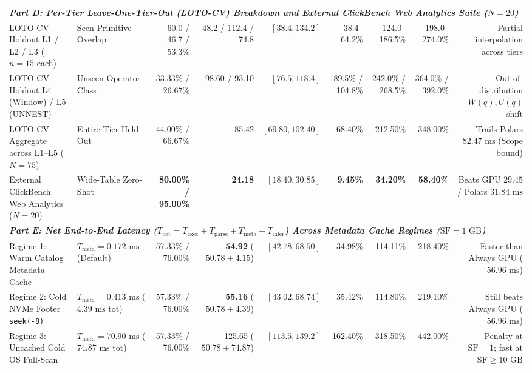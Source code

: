 \documentclass[10pt,a4paper]{article}
\begin{document}
\begin{table}[t!]
{\begin{tabular}{llrrrrrrr}
\hline
\multicolumn{9}{l}{\textit{\textbf{Part D: Per-Tier Leave-One-Tier-Out (LOTO-CV) Breakdown and External ClickBench Web Analytics Suite ($N=20$)}}} \\
LOTO-CV Holdout L1 / L2 / L3 ($n=15$ each) & Seen Primitive Overlap & 60.0 / 46.7 / 53.3\% & 48.2 / 112.4 / 74.8 & $[38.4, 134.2]$ & 38.4--64.2\% & 124.0--186.5\% & 198.0--274.0\% & Partial interpolation across tiers \\
LOTO-CV Holdout L4 (Window) / L5 (UNNEST) & Unseen Operator Class & 33.33\% / 26.67\% & 98.60 / 93.10 & $[76.5, 118.4]$ & 89.5\% / 104.8\% & 242.0\% / 268.5\% & 364.0\% / 392.0\% & Out-of-distribution $W(q), U(q)$ shift \\
LOTO-CV Aggregate across L1--L5 ($N=75$) & Entire Tier Held Out & 44.00\% / 66.67\% & 85.42 & $[69.80, 102.40]$ & 68.40\% & 212.50\% & 348.00\% & Trails Polars $82.47\text{ ms}$ (Scope bound) \\
External ClickBench Web Analytics ($N=20$) & Wide-Table Zero-Shot & \textbf{80.00\% / 95.00\%} & \textbf{24.18} & $[18.40, 30.85]$ & \textbf{9.45\%} & \textbf{34.20\%} & \textbf{58.40\%} & Beats GPU $29.45$ / Polars $31.84\text{ ms}$ \\
\hline
\multicolumn{9}{l}{\textit{\textbf{Part E: Net End-to-End Latency ($T_{\text{net}} = T_{\text{exec}} + T_{\text{parse}} + T_{\text{meta}} + T_{\text{infer}}$) Across Metadata Cache Regimes ($\text{SF}=1\text{ GB}$)}}} \\
Regime 1: Warm Catalog Metadata Cache & $T_{\text{meta}}=0.172\text{ ms}$ (Default) & 57.33\% / 76.00\% & \textbf{54.92} ($50.78+4.15$) & $[42.78, 68.50]$ & 34.98\% & 114.11\% & 218.40\% & Faster than Always GPU ($56.96\text{ ms}$) \\
Regime 2: Cold NVMe Footer \texttt{seek(-8)} & $T_{\text{meta}}=0.413\text{ ms}$ ($4.39\text{ ms}$ tot) & 57.33\% / 76.00\% & \textbf{55.16} ($50.78+4.39$) & $[43.02, 68.74]$ & 35.42\% & 114.80\% & 219.10\% & Still beats Always GPU ($56.96\text{ ms}$) \\
Regime 3: Uncached Cold OS Full-Scan & $T_{\text{meta}}=70.90\text{ ms}$ ($74.87\text{ ms}$ tot) & 57.33\% / 76.00\% & 125.65 ($50.78+74.87$) & $[113.5, 139.2]$ & 162.40\% & 318.50\% & 442.00\% & Penalty at $\text{SF}=1$; fast at $\text{SF}\ge 10\text{ GB}$ \\
\hline
\end{tabular}%
}
\end{table}
\end{document}
